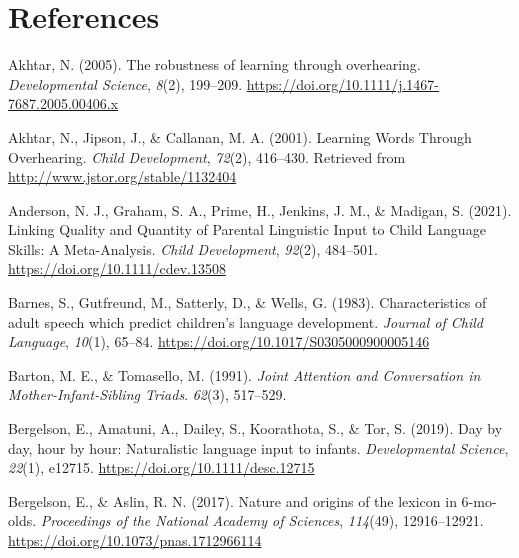 \documentclass[
  man,mask,floatsintext]{apa6}
\newlength{\cslhangindent}
\newlength{\cslentryspacingunit} %
\newenvironment{CSLReferences}[2] %
 {%
  \setlength{\parindent}{0pt}
  \ifodd #1
  \let\oldpar\par
  \def\par{\hangindent=\cslhangindent\oldpar}
  \fi
  \setlength{\parskip}{#2\cslentryspacingunit}
 }%
 {}
\begin{document}
\newpage

\hypertarget{references}{%
\section{References}\label{references}}

\begingroup
\setlength{\parindent}{-0.5in}
\setlength{\leftskip}{0.5in}

\hypertarget{refs}{}
\begin{CSLReferences}{1}{0}
\leavevmode{}%
Akhtar, N. (2005). The robustness of learning through overhearing. \emph{Developmental Science}, \emph{8}(2), 199--209. \url{https://doi.org/10.1111/j.1467-7687.2005.00406.x}

\leavevmode{}%
Akhtar, N., Jipson, J., \& Callanan, M. A. (2001). Learning {Words} {Through} {Overhearing}. \emph{Child Development}, \emph{72}(2), 416--430. Retrieved from \url{http://www.jstor.org/stable/1132404}

\leavevmode{}%
Anderson, N. J., Graham, S. A., Prime, H., Jenkins, J. M., \& Madigan, S. (2021). Linking {Quality} and {Quantity} of {Parental} {Linguistic} {Input} to {Child} {Language} {Skills}: {A} {Meta}-{Analysis}. \emph{Child Development}, \emph{92}(2), 484--501. \url{https://doi.org/10.1111/cdev.13508}

\leavevmode{}%
Barnes, S., Gutfreund, M., Satterly, D., \& Wells, G. (1983). Characteristics of adult speech which predict children's language development. \emph{Journal of Child Language}, \emph{10}(1), 65--84. \url{https://doi.org/10.1017/S0305000900005146}

\leavevmode{}%
Barton, M. E., \& Tomasello, M. (1991). \emph{Joint {Attention} and {Conversation} in {Mother}-{Infant}-{Sibling} {Triads}}. \emph{62}(3), 517--529.

\leavevmode{}%
Bergelson, E., Amatuni, A., Dailey, S., Koorathota, S., \& Tor, S. (2019). Day by day, hour by hour: {Naturalistic} language input to infants. \emph{Developmental Science}, \emph{22}(1), e12715. \url{https://doi.org/10.1111/desc.12715}

\leavevmode{}%
Bergelson, E., \& Aslin, R. N. (2017). Nature and origins of the lexicon in 6-mo-olds. \emph{Proceedings of the National Academy of Sciences}, \emph{114}(49), 12916--12921. \url{https://doi.org/10.1073/pnas.1712966114}


\end{CSLReferences}
\end{document}
